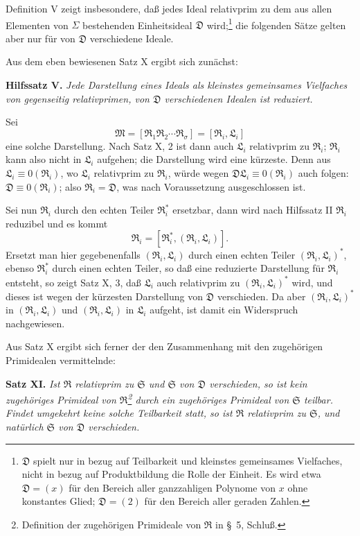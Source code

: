 \documentclass[11pt]{article}
\newcommand{\ideal}[1]{\mathfrak{#1}}
\begin{document}
Definition V zeigt insbesondere, daß jedes Ideal relativprim zu dem aus allen Elementen von $\Sigma$ bestehenden Einheitsideal $\ideal D$ wird;\footnote{$\ideal D$ spielt nur in bezug auf Teilbarkeit und kleinstes gemeinsames Vielfaches, nicht in bezug auf Produktbildung die Rolle der Einheit. Es wird etwa $\ideal D=(x)$ für den Bereich aller ganzzahligen Polynome von $x$ ohne konstantes Glied; $\ideal D=(2)$ für den Bereich aller geraden Zahlen.} die folgenden Sätze gelten aber nur für von $\ideal D$ verschiedene Ideale.

Aus dem eben bewiesenen Satz X ergibt sich zunächst:

\textbf{Hilfssatz V.} \emph{Jede Darstellung eines Ideals als kleinstes gemeinsames Vielfaches von gegenseitig relativprimen, von $\ideal D$ verschiedenen Idealen ist reduziert.}

Sei
\[
 \ideal M=[\ideal R_1\ideal R_2\cdots\ideal R_\sigma]=[\ideal R_i,\ideal L_i]
\]
eine solche Darstellung. Nach Satz X, 2 ist dann auch $\ideal L_i$ relativprim zu $\ideal R_i$; $\ideal R_i$ kann also nicht in $\ideal L_i$ aufgehen; die Darstellung wird eine kürzeste. Denn aus $\ideal L_i\equiv0(\ideal R_i)$, wo $\ideal L_i$ relativprim zu $\ideal R_i$, würde wegen $\ideal D\ideal L_i\equiv0(\ideal R_i)$ auch folgen: $\ideal D\equiv0(\ideal R_i)$; also $\ideal R_i=\ideal D$, was nach Voraussetzung ausgeschlossen ist.

Sei nun $\ideal R_i$ durch den echten Teiler $\ideal R_i^*$ ersetzbar, dann wird nach Hilfssatz II $\ideal R_i$ reduzibel und es kommt
\[
 \ideal R_i=[\ideal R_i^*,(\ideal R_i,\ideal L_i)].
\]
Ersetzt man hier gegebenenfalls $(\ideal R_i,\ideal L_i)$ durch einen echten Teiler $(\ideal R_i,\ideal L_i)^*$, ebenso $\ideal R_i^*$ durch einen echten Teiler, so daß eine reduzierte Darstellung für $\ideal R_i$ entsteht, so zeigt Satz X, 3, daß $\ideal L_i$ auch relativprim zu $(\ideal R_i,\ideal L_i)^*$ wird, und dieses ist wegen der kürzesten Darstellung von $\ideal D$ verschieden. Da aber $(\ideal R_i,\ideal L_i)^*$ in $(\ideal R_i,\ideal L_i)$ und $(\ideal R_i,\ideal L_i)$ in $\ideal L_i$ aufgeht, ist damit ein Widerspruch nachgewiesen.

Aus Satz X ergibt sich ferner der den Zusammenhang mit den zugehörigen Primidealen vermittelnde:

\textbf{Satz XI.} \emph{Ist $\ideal R$ relativprim zu $\ideal S$ und $\ideal S$ von $\ideal D$ verschieden, so ist kein zugehöriges Primideal von $\ideal R$\footnote{Definition der zugehörigen Primideale von $\ideal R$ in \S~5, Schluß.} durch ein zugehöriges Primideal von $\ideal S$ teilbar. Findet umgekehrt keine solche Teilbarkeit statt, so ist $\ideal R$ relativprim zu $\ideal S$, und natürlich $\ideal S$ von $\ideal D$ verschieden.}
\end{document}
